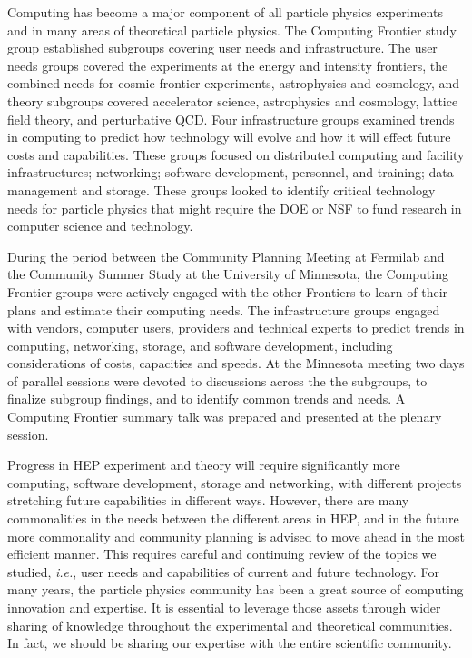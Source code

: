 Computing has become a major component of all particle physics experiments
and in many areas of theoretical particle physics. The Computing Frontier
study group established subgroups covering user needs and infrastructure.
The user needs groups covered the experiments at the energy and intensity
frontiers, the combined needs for cosmic frontier experiments, astrophysics
and cosmology, and theory subgroups covered accelerator science,
astrophysics and cosmology, lattice field theory, and perturbative QCD.
Four infrastructure groups examined trends in computing to predict how
technology will evolve and how it will effect future costs and
capabilities. These groups focused on distributed computing and facility
infrastructures; networking; software development, personnel, and training;
data management and storage. These groups looked to identify critical
technology needs for particle physics that might require the DOE or NSF to
fund research in computer science and technology.

During the period between the Community Planning Meeting at Fermilab and
the Community Summer Study at the University of Minnesota, the Computing
Frontier groups were actively engaged with the other Frontiers to learn of
their plans and estimate their computing needs. The infrastructure groups
engaged with vendors, computer users, providers and technical experts to
predict trends in computing, networking, storage, and software development,
including considerations of costs, capacities and speeds. At the Minnesota
meeting two days of parallel sessions were devoted to discussions across
the the subgroups, to finalize subgroup findings, and to identify common
trends and needs. A Computing Frontier summary talk was prepared and
presented at the plenary session.

Progress in HEP experiment and theory will require significantly more
computing, software development, storage and networking, with different
projects stretching future capabilities in different ways. However, there
are many commonalities in the needs between the different areas in HEP, and
in the future more commonality and community planning is advised to move
ahead in the most efficient manner. This requires careful and continuing
review of the topics we studied, {\it i.e.}, user needs and capabilities of
current and future technology. For many years, the particle physics
community has been a great source of computing innovation and expertise. It
is essential to leverage those assets through wider sharing of knowledge
throughout the experimental and theoretical communities. In fact, we should
be sharing our expertise with the entire scientific community.

